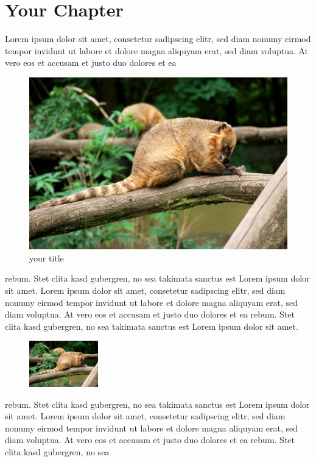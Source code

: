 \documentclass[a4paper]{scrreprt}
\begin{document}
\chapter{Your Chapter}
Lorem ipsum dolor sit amet, consetetur sadipscing elitr, sed diam
nonumy eirmod tempor invidunt ut labore et dolore magna aliquyam
erat, sed diam voluptua. At vero eos et accusam et justo duo dolores
et ea
\begin{figure}[h]
    \centering
    \includegraphics*[width=\linewidth, keepaspectratio]{YourImage.jpg}
    \caption{your title}
    \label{fig:your-reference}
\end{figure}
rebum. Stet clita kasd gubergren, no sea takimata sanctus est Lorem
ipsum dolor sit amet. Lorem ipsum dolor sit amet, consetetur
sadipscing elitr, sed diam nonumy eirmod tempor invidunt ut labore et
dolore magna aliquyam erat, sed diam voluptua. At vero eos et accusam
et justo duo dolores et ea rebum. Stet clita kasd gubergren, no sea
takimata sanctus est Lorem ipsum dolor sit amet.
\begin{figure}[h]
    \centering
    \includegraphics*[width=3cm]{YourImage.jpg}
\end{figure}
rebum. Stet clita kasd gubergren, no sea takimata sanctus est Lorem
ipsum dolor sit amet. Lorem ipsum dolor sit amet, consetetur
sadipscing elitr, sed diam nonumy eirmod tempor invidunt ut labore et
dolore magna aliquyam erat, sed diam voluptua. At vero eos et accusam
et justo duo dolores et ea rebum. Stet clita kasd gubergren, no sea
\end{document}
